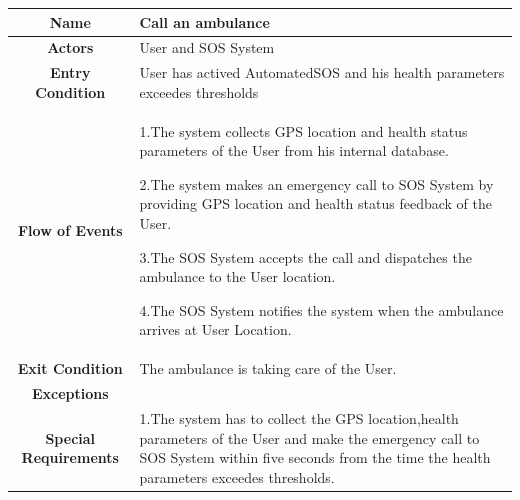       \begin{table}[h!]
        \centering
        \begin{tabularx}{\linewidth}{|c|X|}
          \hline
          \textbf{Name} & Call an ambulance\\
        	\hline
        	\textbf{Actors} & User and SOS System\\
        	\hline
        	\textbf{Entry Condition} & User has actived AutomatedSOS and his health parameters exceedes thresholds\\
        	\hline
        	\textbf{Flow of Events} & 1.The system collects GPS location and health status parameters of the User from his internal 						database.

        					2.The system makes an emergency call to SOS System by providing GPS location and health 							status feedback of the User.

        					3.The SOS System accepts the call and dispatches the ambulance to the User location.

        					4.The SOS System notifies the system when the ambulance arrives at User Location.\\
        	\hline
        	\textbf{Exit Condition} & The ambulance is taking care of the User. \\
        	\hline
        	\textbf{Exceptions} & \\
        	\hline
        	\textbf{Special Requirements} & 1.The system has to collect the GPS location,health parameters of the User and make the 							emergency call to SOS System within five seconds from the time the health parameters 							exceedes thresholds.\\
          \hline
        \end{tabularx}
      \end{table}

   

